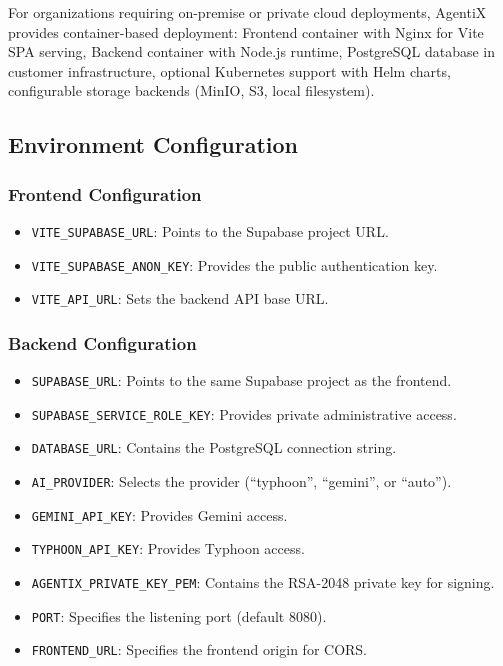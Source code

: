 \documentclass[12pt,oneside,openright,a4paper]{cpe-english-project}
\begin{document}
For organizations requiring on-premise or private cloud deployments, AgentiX provides container-based deployment: Frontend container with Nginx for Vite SPA serving, Backend container with Node.js runtime, PostgreSQL database in customer infrastructure, optional Kubernetes support with Helm charts, configurable storage backends (MinIO, S3, local filesystem).

\vspace{1em}

\subsection{Environment Configuration}

\subsubsection{Frontend Configuration}

\begin{itemize}
\item \texttt{VITE\_SUPABASE\_URL}: Points to the Supabase project URL.
\item \texttt{VITE\_SUPABASE\_ANON\_KEY}: Provides the public authentication key.
\item \texttt{VITE\_API\_URL}: Sets the backend API base URL.
\end{itemize}

\subsubsection{Backend Configuration}

\begin{itemize}
\item \texttt{SUPABASE\_URL}: Points to the same Supabase project as the frontend.
\item \texttt{SUPABASE\_SERVICE\_ROLE\_KEY}: Provides private administrative access.
\item \texttt{DATABASE\_URL}: Contains the PostgreSQL connection string.
\item \texttt{AI\_PROVIDER}: Selects the provider (``typhoon'', ``gemini'', or ``auto'').
\item \texttt{GEMINI\_API\_KEY}: Provides Gemini access.
\item \texttt{TYPHOON\_API\_KEY}: Provides Typhoon access.
\item \texttt{AGENTIX\_PRIVATE\_KEY\_PEM}: Contains the RSA-2048 private key for signing.
\item \texttt{PORT}: Specifies the listening port (default 8080).
\item \texttt{FRONTEND\_URL}: Specifies the frontend origin for CORS.
\end{itemize}
\end{document}
